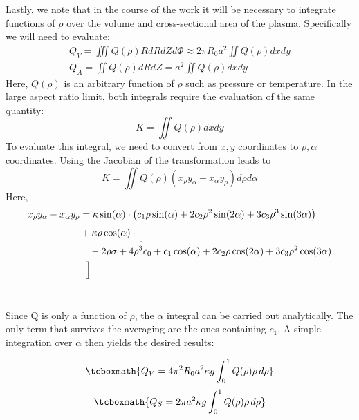 Lastly, we note that in the course of the work it will be necessary to integrate functions of $\rho$ over the volume and cross-sectional area of the plasma. Specifically we will need to evaluate:
\begin{gather}
	Q_V = \iiint Q(\rho) R dR dZ d\Phi \approx 2 \pi R_0 a^2 \iint Q(\rho) dx dy \\
	Q_A = \iint Q(\rho) dR dZ = a^2 \iint Q(\rho) dx dy
\end{gather}
Here, $Q(\rho)$ is an arbitrary function of $\rho$ such as pressure or temperature. In the large aspect ratio limit, both integrals require the evaluation of the same quantity:
\begin{equation}
	K = \iint Q(\rho) dx dy
\end{equation}
To evaluate this integral, we need to convert from $x, y$ coordinates to $\rho, \alpha$ coordinates. Using the Jacobian of the transformation leads to
\begin{equation}
	K = \iint Q(\rho) (x_\rho y_\alpha - x_\alpha y_\rho ) d\rho d\alpha
\end{equation}
Here, ~
\begin{equation}
\begin{split}
	\small
	x_\rho y_\alpha - x_\alpha y_\rho & = \kappa \sin(\alpha) \cdot \left( c_1 \rho \sin(\alpha) + 2 c_2 \rho^2 \sin(2\alpha)  + 3 c_3 \rho^3 \sin(3\alpha)  \right) \\
		& + \kappa \rho \cos(\alpha) \cdot \Big[ \\
		& \ \ \ -2 \rho \sigma + 4 \rho^3 c_0 + c_1 \cos(\alpha) + 2 c_2 \rho \cos(2\alpha) + 3 c_3 \rho^2 \cos(3\alpha) \\
		& \ \ \Big]
\end{split}
\end{equation} ~

Since Q is only a function of $\rho$, the $\alpha$ integral can be carried out analytically. The only term that survives the averaging are the ones containing $c_1$. A simple integration over $\alpha$ then yields the desired results:

\begin{equation}
  	\label{eq:qv}
  	\tcboxmath{
 	Q_V = 4 \pi^2 R_0 a^2 \kappa g \int_0^1 Q(\rho) \rho \, d\rho
 	}
\end{equation}
\begin{equation}
	\label{eq:qs}
  	\tcboxmath{
	Q_S = 2 \pi a^2 \kappa g \int_0^1 Q(\rho) \rho \, d\rho
	}
\end{equation}
